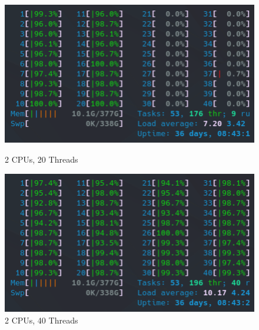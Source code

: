 \begin{figure}[!h]
    \centering
    \captionsetup{width=.48\linewidth}
    \begin{minipage}[t]{0.48\textwidth}
        \includegraphics[width=\textwidth]{figures/htop_cpus/2CPUs_20Threads.png}
        \caption{2 CPUs, 20 Threads}\label{fig:2CPUs_20Threads}
    \end{minipage}
    \hspace{0.4cm}
    \centering
    \captionsetup{width=.48\linewidth}
    \begin{minipage}[t]{0.48\textwidth}
        \includegraphics[width=\textwidth]{figures/htop_cpus/2CPUs_40Threads.png}
        \caption{2 CPUs, 40 Threads}\label{fig:2CPUs_40Threads}
    \end{minipage}
\end{figure}


